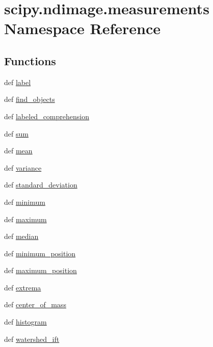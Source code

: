 \hypertarget{namespacescipy_1_1ndimage_1_1measurements}{}\section{scipy.\+ndimage.\+measurements Namespace Reference}
\label{namespacescipy_1_1ndimage_1_1measurements}
\subsection*{Functions}
\begin{DoxyCompactItemize}
\item 
def \hyperlink{namespacescipy_1_1ndimage_1_1measurements_a4779cd2460f28fb863d04f22bec5969f}{label}
\item 
def \hyperlink{namespacescipy_1_1ndimage_1_1measurements_a30eb4d217c3674728ca3b74bbf28a5a2}{find\+\_\+objects}
\item 
def \hyperlink{namespacescipy_1_1ndimage_1_1measurements_aad766a883a0d5a42fe9ef21bbad19ac3}{labeled\+\_\+comprehension}
\item 
def \hyperlink{namespacescipy_1_1ndimage_1_1measurements_a6499745b71815c9e0e2f1944c7751244}{sum}
\item 
def \hyperlink{namespacescipy_1_1ndimage_1_1measurements_ae62c6610072f012091b8b7c8911a2cb6}{mean}
\item 
def \hyperlink{namespacescipy_1_1ndimage_1_1measurements_a07e4c0d6050154775cf7e7bac36cb6a7}{variance}
\item 
def \hyperlink{namespacescipy_1_1ndimage_1_1measurements_a6e711998894987daa5d8ad808ab153fa}{standard\+\_\+deviation}
\item 
def \hyperlink{namespacescipy_1_1ndimage_1_1measurements_a577cd3d8098bf2f636765bfd1b8a5ae7}{minimum}
\item 
def \hyperlink{namespacescipy_1_1ndimage_1_1measurements_a79e4232e0da6dbfd60a61c84fad65dcb}{maximum}
\item 
def \hyperlink{namespacescipy_1_1ndimage_1_1measurements_aa575b5ebc60e6efea149f43d4a6f45fa}{median}
\item 
def \hyperlink{namespacescipy_1_1ndimage_1_1measurements_a5bd34a02403e016620eee0e25a13497f}{minimum\+\_\+position}
\item 
def \hyperlink{namespacescipy_1_1ndimage_1_1measurements_aaded7d96df41ce4cbd69fe8e6e1c3929}{maximum\+\_\+position}
\item 
def \hyperlink{namespacescipy_1_1ndimage_1_1measurements_a466908127ff956a6a4a1a32d65fab802}{extrema}
\item 
def \hyperlink{namespacescipy_1_1ndimage_1_1measurements_a9e05486d5384d50578bb640fd51f3c76}{center\+\_\+of\+\_\+mass}
\item 
def \hyperlink{namespacescipy_1_1ndimage_1_1measurements_a7d01b47d6054612b07616e61d9fa0f04}{histogram}
\item 
def \hyperlink{namespacescipy_1_1ndimage_1_1measurements_ab82d723119193ba3fa4b8a676508f6e7}{watershed\+\_\+ift}
\end{DoxyCompactItemize}
